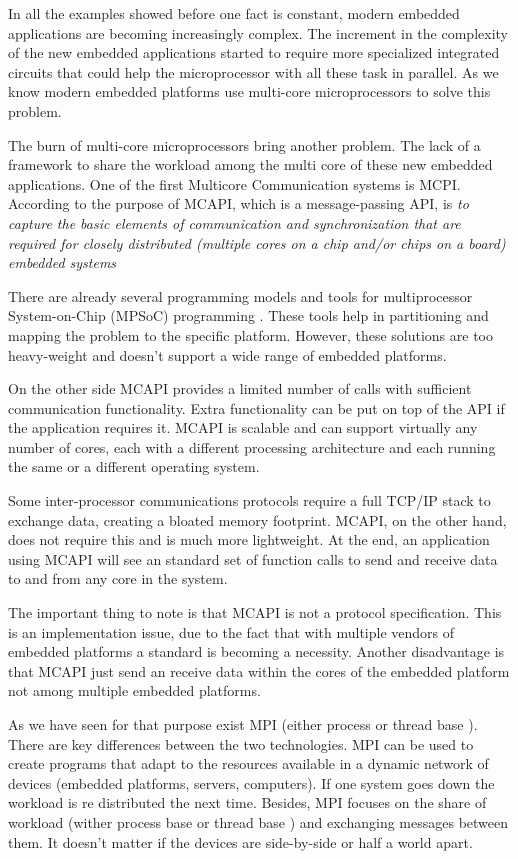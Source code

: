 In all the examples showed before one fact is constant, modern embedded
applications are becoming increasingly complex. The increment in the complexity
of the new embedded applications started to require more specialized integrated
circuits that could help the microprocessor with all these task in parallel. As
we know modern embedded platforms use multi-core microprocessors to solve this
problem.

The burn of multi-core microprocessors bring another problem. The lack of a
framework to share the workload among the multi core of these new embedded
applications. One of the first Multicore Communication systems is MCPI.
According to \cite{MCAPI} the purpose of MCAPI, which is a message-passing API,
is \textit{to capture the basic elements of communication and synchronization
that are required for closely distributed (multiple cores on a chip and/or
chips on a board) embedded systems} 

There are already several programming models and tools for multiprocessor
System-on-Chip (MPSoC) programming \cite{Wolf} \cite{Matilainen}. These tools help  in
partitioning and mapping the problem to the specific platform. However, these
solutions are too heavy-weight and doesn't support a wide range of embedded
platforms. 

On the other side MCAPI provides a limited number of calls with sufficient
communication functionality. Extra functionality can be put on top of the API
if the application requires it. MCAPI is scalable and can support virtually any
number of cores, each with a different processing architecture and each running
the same or a different operating system.

Some inter-processor communications protocols \cite{Wolf} require a full TCP/IP
stack to exchange data, creating a bloated memory footprint. MCAPI, on the
other hand, does not require this and is much more lightweight. At the end, an
application using MCAPI will see an standard set of function calls to send and
receive data to and from any core in the system. 

The important thing to note is that MCAPI is not a protocol specification. This
is an implementation issue, due to the fact that with multiple vendors of
embedded platforms a standard is becoming a necessity. Another disadvantage is
that MCAPI just send an receive data within the cores of the embedded platform
not among multiple embedded platforms. 

As we have seen for that purpose exist MPI (either process or thread base ).
There are key differences between the two technologies. MPI can be used to
create programs that adapt to the resources available in a dynamic network of
devices (embedded platforms, servers, computers). If one system goes down the
workload is re distributed the next time. Besides, MPI focuses on the share of
workload (wither process base or thread base ) and exchanging messages between
them. It doesn't matter if the devices are side-by-side or half a world apart. 

